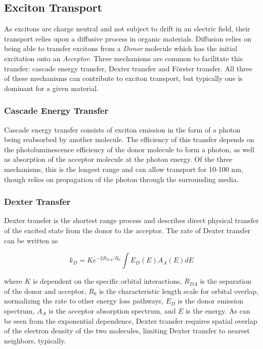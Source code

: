 \documentclass[../thesis.tex]{subfiles}
\begin{document}
\subsection{Exciton Transport}

As excitons are charge neutral and not subject to drift in an electric field, their transport relies upon a diffusive process in organic materials.
Diffusion relies on being able to transfer excitons from a \textit{Donor} molecule which has the initial excitation onto an \textit{Acceptor}.
Three mechanisms are common to facilitate this transfer: cascade energy transfer, Dexter transfer and F\"{o}rster transfer.
All three of these mechanisms can contribute to exciton transport, but typically one is dominant for a given material.

\subsubsection{Cascade Energy Transfer}

Cascade energy transfer consists of exciton emission in the form of a photon being reabsorbed by another molecule.\supercite{Turro1991a}
The efficiency of this transfer depends on the photoluminescence efficiency of the donor molecule to form a photon, as well as absorption of the acceptor molecule at the photon energy.
Of the three mechanisms, this is the longest range and can allow transport for 10-100 nm, though relies on propagation of the photon through the surrounding media.

\subsubsection{Dexter Transfer}

Dexter transfer is the shortest range process and describes direct physical transfer of the excited state from the donor to the acceptor.
The rate of Dexter transfer can be written as\supercite{Turro1991a}

\begin{equation}
k_D=Ke^{-2R_{DA}/R_0}\int{ E_D(E)A_A(E)dE}
\label{eqn:dexter_rate}
\end{equation}

where $K$ is dependent on the specific orbital interactions, $R_{DA}$ is the separation of the donor and acceptor, $R_0$ is the characteristic length scale for orbital overlap, normalizing the rate to other energy loss pathways, $E_D$ is the donor emission spectrum, $A_A$ is the acceptor absorption spectrum, and $E$ is the energy.
As can be seen from the exponential dependence, Dexter transfer requires spatial overlap of the electron density of the two molecules, limiting Dexter transfer to nearest neighbors, typically.
\end{document}
